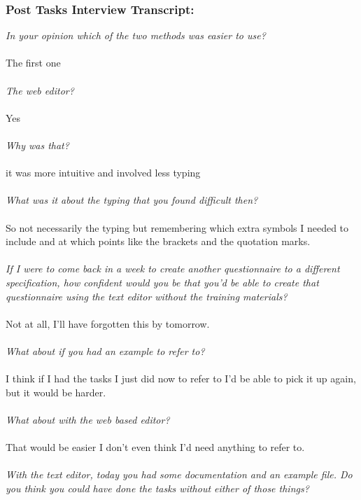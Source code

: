 \subsubsection*{Post Tasks Interview Transcript:}
\textit{In your opinion which of the two methods was easier to use?}
\\
\\
The first one
\\
\\
\textit{The web editor?}
\\
\\
Yes
\\
\\
\textit{Why was that?}
\\
\\
it was more intuitive and involved less typing
\\
\\
\textit{What was it about the typing that you found difficult then?}
\\
\\
So not necessarily the typing but remembering which extra symbols I needed to include and at which points like the brackets and the quotation marks.
\\
\\
\textit{If I were to come back in a week to create another questionnaire to a different specification, how confident would you be that you'd be able to create that questionnaire using the text editor without the training materials?}
\\
\\
Not at all, I'll have forgotten this by tomorrow.
\\
\\
\textit{What about if you had an example to refer to?}
\\
\\
I think if I had the tasks I just did now to refer to I'd be able to pick it up again, but it would be harder.
\\
\\
\textit{What about with the web based editor?}
\\
\\
That would be easier I don't even think I'd need anything to refer to.
\\
\\
\textit{With the text editor, today you had some documentation and an example file. Do you think you could have done the tasks without either of those things?}
\\
\\
